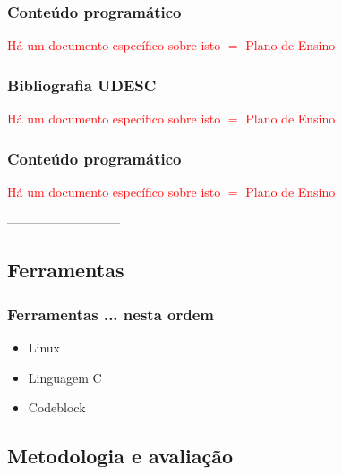 \begin{frame}
\frametitle{Conteúdo programático}

   \textcolor{red}{Há um documento específico sobre isto $=$ Plano de Ensino}
    
\end{frame}


\begin{frame}
\frametitle{Bibliografia UDESC}

    \textcolor{red}{Há um documento específico sobre isto $=$ Plano de Ensino}
      
 \end{frame}


\begin{frame}
\frametitle{Conteúdo programático}

 \textcolor{red}{Há um documento específico sobre isto $=$ Plano de Ensino}

\end{frame}
---------------------------

\subsection{Ferramentas}
\begin{frame}

    \frametitle{Ferramentas ... nesta ordem}

    \begin{itemize}
          \item Linux 
      \item Linguagem C
      \item Codeblock

      
    \end{itemize}
\end{frame}


\subsection{Metodologia e avaliação}  

